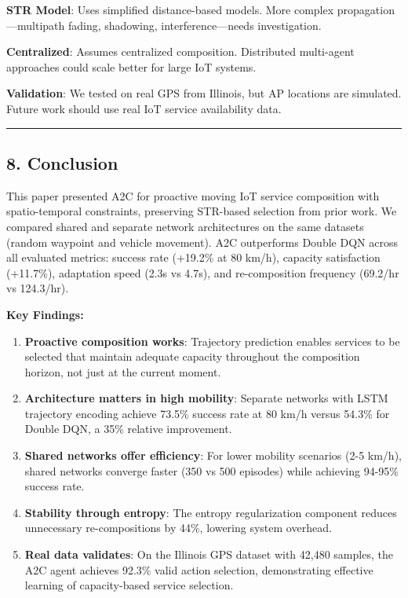 \documentclass[
  10pt,
  twocolumn,
]{article}
\begin{document}
\textbf{STR Model}: Uses simplified distance-based models. More complex
propagation---multipath fading, shadowing, interference---needs
investigation.

\textbf{Centralized}: Assumes centralized composition. Distributed
multi-agent approaches could scale better for large IoT systems.

\textbf{Validation}: We tested on real GPS from Illinois, but AP
locations are simulated. Future work should use real IoT service
availability data.

\begin{center}\rule{0.5\linewidth}{0.5pt}\end{center}

\hypertarget{conclusion}{%
	\subsection{8. Conclusion}\label{conclusion}}

This paper presented A2C for proactive moving IoT service composition
with spatio-temporal constraints, preserving STR-based selection from
prior work. We compared shared and separate network architectures on the
same datasets (random waypoint and vehicle movement). A2C outperforms
Double DQN across all evaluated metrics: success rate (+19.2\% at 80
km/h), capacity satisfaction (+11.7\%), adaptation speed (2.3s vs 4.7s),
and re-composition frequency (69.2/hr vs 124.3/hr).

\textbf{Key Findings:}

\begin{enumerate}
	\def\labelenumi{\arabic{enumi}.}
	\item
	      \textbf{Proactive composition works}: Trajectory prediction enables
	      services to be selected that maintain adequate capacity throughout the
	      composition horizon, not just at the current moment.
	\item
	      \textbf{Architecture matters in high mobility}: Separate networks with
	      LSTM trajectory encoding achieve 73.5\% success rate at 80 km/h versus
	      54.3\% for Double DQN, a 35\% relative improvement.
	\item
	      \textbf{Shared networks offer efficiency}: For lower mobility
	      scenarios (2-5 km/h), shared networks converge faster (350 vs 500
	      episodes) while achieving 94-95\% success rate.
	\item
	      \textbf{Stability through entropy}: The entropy regularization
	      component reduces unnecessary re-compositions by 44\%, lowering system
	      overhead.
	\item
	      \textbf{Real data validates}: On the Illinois GPS dataset with 42,480
	      samples, the A2C agent achieves 92.3\% valid action selection,
	      demonstrating effective learning of capacity-based service selection.
\end{enumerate}
\end{document}
